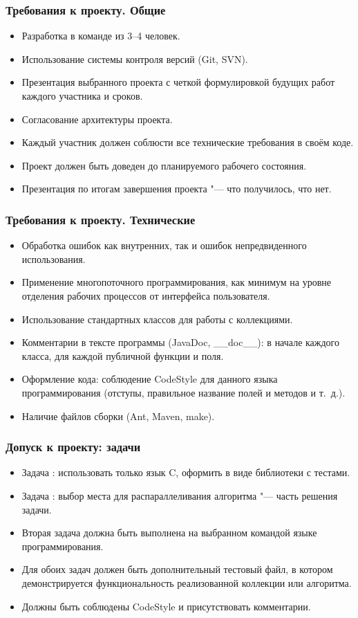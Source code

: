 \documentclass[default]{beamer}
\newcommand*{\No}{\textnumero}
\begin{document}
	\begin{frame}
		\frametitle{Требования к проекту. Общие}
		
		\begin{itemize}
			\item Разработка в команде из 3--4 человек.
			\item Использование системы контроля версий (Git, SVN).
			\item Презентация выбранного проекта с четкой формулировкой будущих работ каждого участника и сроков.
			\item Согласование архитектуры проекта.
			\item Каждый участник должен соблюсти все технические требования в своём коде.
			\item Проект должен быть доведен до планируемого рабочего состояния.
			\item Презентация по итогам завершения проекта "--- что получилось, что нет.
		\end{itemize}
	\end{frame}

	\begin{frame}
		\frametitle{Требования к проекту. Технические}
		
		\begin{itemize}
			\item Обработка ошибок как внутренних, так и ошибок непредвиденного использования.
			\item Применение многопоточного программирования, как минимум на уровне отделения рабочих процессов от интерфейса пользователя.
			\item Использование стандартных классов для работы с коллекциями.
			\item Комментарии в тексте программы (JavaDoc, \_\_doc\_\_): в начале каждого класса, для каждой публичной функции и поля.
			\item Оформление кода: соблюдение CodeStyle для данного языка программирования (отступы, правильное название полей и методов и т.~д.).
			\item Наличие файлов сборки (Ant, Maven, make).
		\end{itemize}
	\end{frame}

	\begin{frame}
		\frametitle{Допуск к проекту: задачи}
		
		\begin{itemize}
			\item Задача \No1: использовать только язык C, оформить в виде библиотеки с тестами.
			\item Задача \No2: выбор места для распараллеливания алгоритма "--- часть решения задачи.			
			\item Вторая задача должна быть выполнена на выбранном командой языке программирования.
			\item Для обоих задач должен быть дополнительный тестовый файл, в котором демонстрируется функциональность реализованной коллекции или алгоритма.
			\item Должны быть соблюдены CodeStyle и присутствовать комментарии.
		\end{itemize}
	\end{frame}
\end{document}
